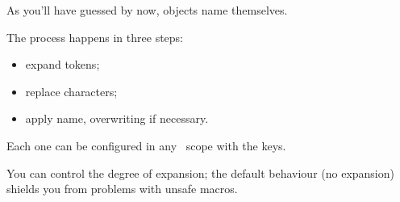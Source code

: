 As you'll have guessed by now, objects name themselves.

The process happens in three steps:
\begin{itemize}[nosep]
  \item expand tokens;
  \item replace characters;
  \item apply name, overwriting if necessary.
  \end{itemize}

Each one can be configured in any \koDi\ scope with the keys.

You can control the degree of expansion; the default behaviour (no expansion)
shields you from problems with unsafe macros.

